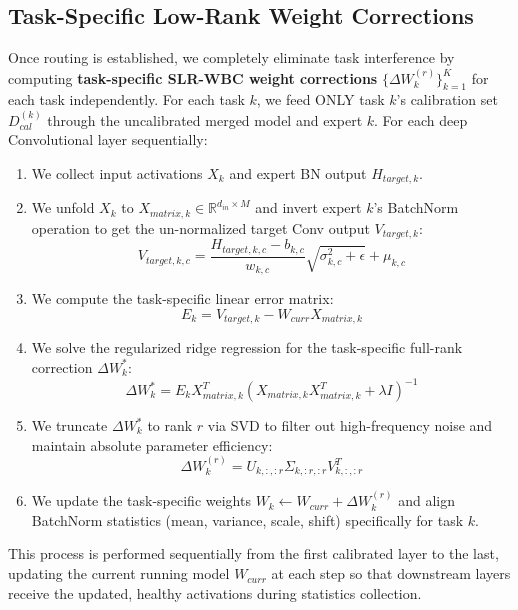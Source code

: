 \documentclass{article}
\theoremstyle{plain}
\theoremstyle{definition}
\theoremstyle{remark}
\begin{document}
\subsection{Task-Specific Low-Rank Weight Corrections}
Once routing is established, we completely eliminate task interference by computing \textbf{task-specific SLR-WBC weight corrections} $\{\Delta W^{(r)}_k\}_{k=1}^K$ for each task independently.
For each task $k$, we feed ONLY task $k$'s calibration set $D_{cal}^{(k)}$ through the uncalibrated merged model and expert $k$. For each deep Convolutional layer sequentially:
\begin{enumerate}
    \item We collect input activations $X_k$ and expert BN output $H_{target,k}$.
    \item We unfold $X_k$ to $X_{matrix,k} \in \mathbb{R}^{d_{in} \times M}$ and invert expert $k$'s BatchNorm operation to get the un-normalized target Conv output $V_{target,k}$:
    \begin{equation}
    V_{target,k,c} = \frac{H_{target,k,c} - b_{k,c}}{w_{k,c}} \sqrt{\sigma_{k,c}^2 + \epsilon} + \mu_{k,c}
    \end{equation}
    \item We compute the task-specific linear error matrix:
    \begin{equation}
    E_k = V_{target,k} - W_{curr} X_{matrix,k}
    \end{equation}
    \item We solve the regularized ridge regression for the task-specific full-rank correction $\Delta W^*_k$:
    \begin{equation}
    \Delta W^*_k = E_k X_{matrix,k}^T (X_{matrix,k} X_{matrix,k}^T + \lambda I)^{-1}
    \end{equation}
    \item We truncate $\Delta W^*_k$ to rank $r$ via SVD to filter out high-frequency noise and maintain absolute parameter efficiency:
    \begin{equation}
    \Delta W^{(r)}_k = U_{k,:,:r} \Sigma_{k,:r,:r} V_{k,:,:r}^T
    \end{equation}
    \item We update the task-specific weights $W_k \leftarrow W_{curr} + \Delta W^{(r)}_k$ and align BatchNorm statistics (mean, variance, scale, shift) specifically for task $k$.
\end{enumerate}

This process is performed sequentially from the first calibrated layer to the last, updating the current running model $W_{curr}$ at each step so that downstream layers receive the updated, healthy activations during statistics collection.
\end{document}
